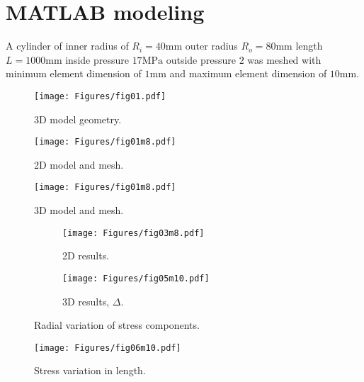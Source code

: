 \documentclass[11pt]{article} %
\begin{document}
\section{MATLAB modeling}\label{sec_numm}
A cylinder of inner radius of
$R_i=40\mathrm{mm}$
outer radius
 $R_o=80\mathrm{mm}$
length 
  $L=1000\mathrm{mm}$
inside pressure
   $17\mathrm{MPa}$
outside pressure
    $2$
was meshed with minimum element dimension of 
     $1\mathrm{mm}$
      and maximum element dimension of
      $10\mathrm{mm}$.
\begin{figure}\centering
\texttt{[image: Figures/fig01.pdf]}
\caption{3D model geometry.}\label{fig01}
\end{figure}
\begin{figure}\centering
\texttt{[image: Figures/fig01m8.pdf]}
\caption{2D model and mesh.}\label{fig01m}
\end{figure}

\begin{figure}\centering
\texttt{[image: Figures/fig01m8.pdf]}
\caption{3D model and mesh.}\label{fig01m}
\end{figure}

\begin{figure}\centering
\begin{subfigure}{\textwidth}\centering
\texttt{[image: Figures/fig03m8.pdf]}
\caption{2D results.}\label{fig05a}
\end{subfigure}
\begin{subfigure}{\textwidth}\centering
%
\texttt{[image: Figures/fig05m10.pdf]}
\caption{3D results, $\Delta.$}\label{fig05b}
\end{subfigure}
\caption{Radial variation of stress components.}\label{fig05}
\end{figure}

\begin{figure}\centering
%
\texttt{[image: Figures/fig06m10.pdf]}
\caption{Stress variation in length.}\label{fig06}
\end{figure}
\end{document}
